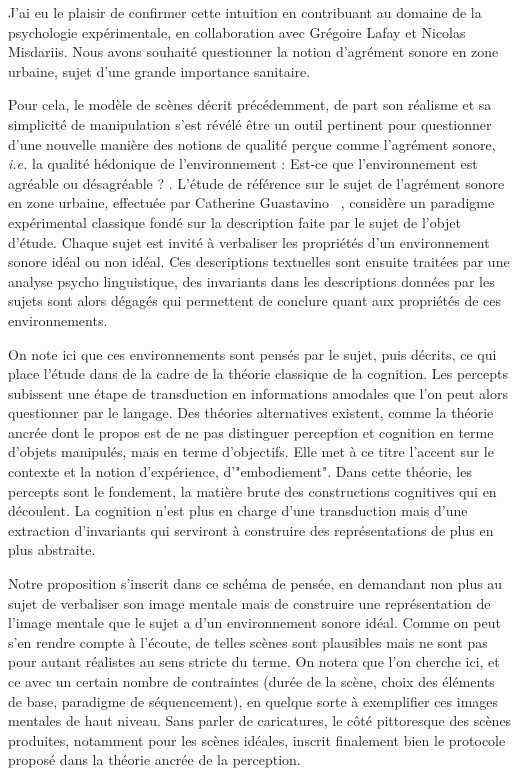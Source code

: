 J'ai eu le plaisir de confirmer cette intuition en contribuant au domaine de la psychologie expérimentale, en collaboration avec Grégoire Lafay et Nicolas Misdariis. Nous avons souhaité questionner la notion d'agrément sonore en zone urbaine, sujet d'une grande importance sanitaire.

Pour cela, le modèle de scènes décrit précédemment, de part son réalisme et sa simplicité de manipulation s'est révélé être un outil pertinent pour questionner d'une nouvelle manière des notions de qualité perçue comme l'agrément sonore, \textit{i.e.} la qualité hédonique de l’environnement : \og Est-ce que l’environnement est agréable ou désagréable ? \fg. L'étude de référence sur le sujet de l'agrément sonore en zone urbaine, effectuée par Catherine Guastavino ~\cite{guastavino2006ideal}, considère un paradigme expérimental classique fondé sur la description faite par le sujet de l'objet d'étude. Chaque sujet est invité à verbaliser les propriétés d'un environnement sonore idéal ou non idéal. Ces descriptions textuelles sont ensuite traitées par une analyse psycho linguistique, des invariants dans les descriptions données par les sujets sont alors dégagés qui permettent de conclure quant aux propriétés de ces environnements.

On note ici que ces environnements sont pensés par le sujet, puis décrits, ce qui place l'étude dans de la cadre de la théorie classique de la cognition. Les percepts subissent une étape de transduction en informations amodales que l'on peut alors questionner par le langage. Des théories alternatives existent, comme la théorie ancrée\cite{barsalou2010grounded} dont le propos est de ne pas distinguer perception et cognition en terme d'objets manipulés, mais en terme d'objectifs. Elle met à ce titre l'accent sur le contexte et la notion d'expérience, d'"embodiement". Dans cette théorie, les percepts sont le fondement, la matière brute des constructions cognitives qui en découlent. La cognition n'est plus en charge d'une transduction mais d'une extraction d'invariants qui serviront à construire des représentations de plus en plus abstraite.

Notre proposition s'inscrit dans ce schéma de pensée, en demandant non plus au sujet de verbaliser son image mentale mais de \og construire \fg une représentation de l'image mentale que le sujet a d'un environnement sonore idéal. Comme on peut s'en rendre compte à l'écoute, de telles scènes sont plausibles mais ne sont pas pour autant réalistes au sens stricte du terme. On notera que l'on cherche ici, et ce avec un certain nombre de contraintes (durée de la scène, choix des éléments de base, paradigme de séquencement), en quelque sorte à exemplifier ces images mentales de haut niveau. Sans parler de caricatures, le côté pittoresque des scènes produites, notamment pour les scènes idéales, inscrit finalement bien le protocole proposé dans la théorie ancrée de la perception.

